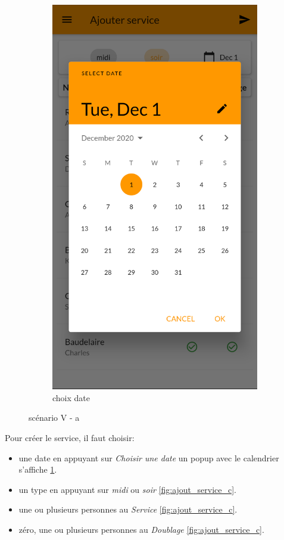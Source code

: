 \begin{figure}[!h]
\begin{subfigure}{.3\textwidth}
            \includegraphics[width=0.9\linewidth]{screenshots/scenario_05/ajout_service_b.png}
            \caption{choix date}
            \label{fig:choix_date}
        \end{subfigure}
        \caption{scénario V - a}
        \label{fig:scen05a}
    \end{figure}

    Pour créer le service, il faut choisir:
    \smallskip
    \begin{itemize}
        \item une date en appuyant sur \textit{Choisir une date} un popup avec le calendrier s'affiche \ref{fig:choix_date}.
        \item un type en appuyant sur \textit{midi} ou \textit{soir} \ref{fig:ajout_service_c}. 
        \item une ou plusieurs personnes au \textit{Service} \ref{fig:ajout_service_c}.
        \item zéro, une ou plusieurs personnes au \textit{Doublage} \ref{fig:ajout_service_c}.
    \end{itemize}
    
